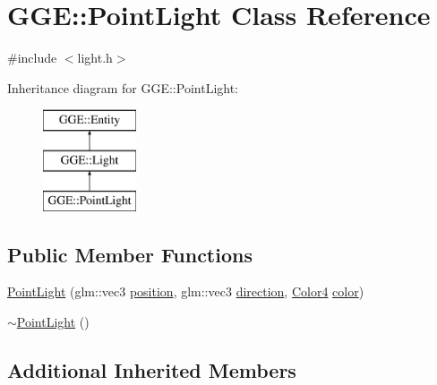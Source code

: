 \hypertarget{class_g_g_e_1_1_point_light}{\section{G\+G\+E\+:\+:Point\+Light Class Reference}
\label{class_g_g_e_1_1_point_light}
}


{\ttfamily \#include $<$light.\+h$>$}

Inheritance diagram for G\+G\+E\+:\+:Point\+Light\+:\begin{figure}[H]
\begin{center}
\leavevmode
\includegraphics[height=3.000000cm]{class_g_g_e_1_1_point_light}
\end{center}
\end{figure}
\subsection*{Public Member Functions}
\begin{DoxyCompactItemize}
\item 
\hyperlink{class_g_g_e_1_1_point_light_a57e66c237c2a361f155aafec8dc11e5f}{Point\+Light} (glm\+::vec3 \hyperlink{class_g_g_e_1_1_entity_a38a9fa01bfaf37ca415181ba6a179d3f}{position}, glm\+::vec3 \hyperlink{class_g_g_e_1_1_entity_a80c69365314541244f26e4a15b4223d8}{direction}, \hyperlink{namespace_g_g_e_aff43741fd756c83cbfd5d4d5cd9fcf41}{Color4} \hyperlink{class_g_g_e_1_1_light_a4d2f4605abc44637feac0d0312ce0717}{color})
\item 
\hyperlink{class_g_g_e_1_1_point_light_a82fa83bf3fa1a70b04745d5710d964a8}{$\sim$\+Point\+Light} ()
\end{DoxyCompactItemize}
\subsection*{Additional Inherited Members}


